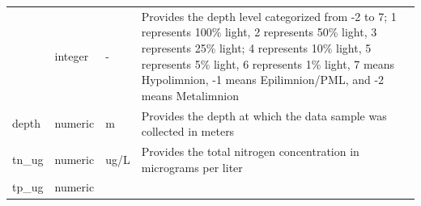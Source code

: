 \documentclass[12pt,]{article}
\begin{document}
\begin{longtable}[]{@{}llll@{}}
\begin{minipage}[t]{0.25\columnwidth}
\end{minipage} & \begin{minipage}[t]{0.13\columnwidth}\raggedright
integer\strut
\end{minipage} & \begin{minipage}[t]{0.12\columnwidth}\raggedright
-\strut
\end{minipage} & \begin{minipage}[t]{0.38\columnwidth}\raggedright
Provides the depth level categorized from -2 to 7; 1 represents 100\%
light, 2 represents 50\% light, 3 represents 25\% light; 4 represents
10\% light, 5 represents 5\% light, 6 represents 1\% light, 7 means
Hypolimnion, -1 means Epilimnion/PML, and -2 means Metalimnion\strut
\end{minipage}\tabularnewline
\begin{minipage}[t]{0.25\columnwidth}\raggedright
depth\strut
\end{minipage} & \begin{minipage}[t]{0.13\columnwidth}\raggedright
numeric\strut
\end{minipage} & \begin{minipage}[t]{0.12\columnwidth}\raggedright
m\strut
\end{minipage} & \begin{minipage}[t]{0.38\columnwidth}\raggedright
Provides the depth at which the data sample was collected in
meters\strut
\end{minipage}\tabularnewline
\begin{minipage}[t]{0.25\columnwidth}\raggedright
tn\_ug\strut
\end{minipage} & \begin{minipage}[t]{0.13\columnwidth}\raggedright
numeric\strut
\end{minipage} & \begin{minipage}[t]{0.12\columnwidth}\raggedright
ug/L\strut
\end{minipage} & \begin{minipage}[t]{0.38\columnwidth}\raggedright
Provides the total nitrogen concentration in micrograms per liter\strut
\end{minipage}\tabularnewline
\begin{minipage}[t]{0.25\columnwidth}\raggedright
tp\_ug\strut
\end{minipage} & \begin{minipage}[t]{0.13\columnwidth}\raggedright
numeric\strut
\end{minipage} & \begin{minipage}[t]{0.12\columnwidth}\raggedright

\end{minipage}
\end{longtable}
\end{document}
